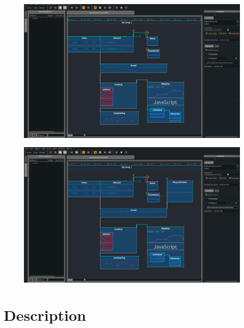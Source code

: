 \documentclass[draft]{beamer}
\begin{document}
\begin{frame} 
    \Large
    \begin{figure}
        \centering
        \includegraphics[width=\textwidth]{images/screens/13.png}
    \end{figure}
\end{frame}
\begin{frame} 
    \Large
    \begin{figure}
        \centering
        \includegraphics[width=\textwidth]{images/screens/14.png}
    \end{figure}
\end{frame}

\section{Description}
\end{document}
